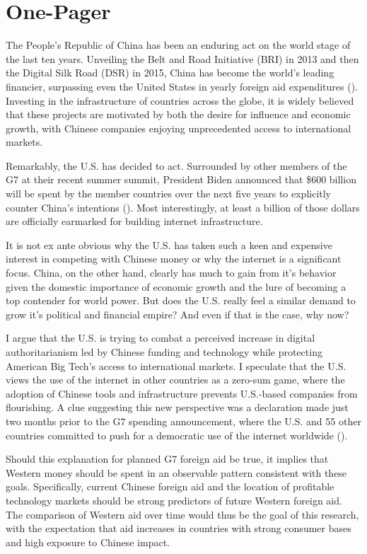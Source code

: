 \documentclass{article}
\begin{document}
\section*{One-Pager}
The People's Republic of China has been an enduring act on the world stage of the last ten years. Unveiling the Belt and Road Initiative (BRI) in 2013 and then the Digital Silk Road (DSR) in 2015, China has become the world's leading financier, surpassing even the United States in yearly foreign aid expenditures (\cite{dreherND}).
Investing in the infrastructure of countries across the globe, it is widely believed that these projects are motivated by both the desire for influence and economic growth, with Chinese companies enjoying unprecedented access to international markets.

Remarkably, the U.S. has decided to act. Surrounded by other members of the G7 at their recent summer summit, President Biden announced that \$600 billion will be spent by the member countries over the next five years to explicitly counter China's intentions (\cite{NPR}). Most interestingly, at least a billion of those dollars are officially earmarked for building internet infrastructure. \nocite{US} \nocite{DSR}

It is not ex ante obvious why the U.S. has taken such a keen and expensive interest in competing with Chinese money or why the internet is a significant focus. China, on the other hand, clearly has much to gain from it's behavior given the domestic importance of economic growth and the lure of becoming a top contender for world power. But does the U.S. really feel a similar demand to grow it's political and financial empire? And even if that is the case, why now?

I argue that the U.S. is trying to combat a perceived increase in digital authoritarianism led by Chinese funding and technology while protecting American Big Tech's access to international markets. I speculate that the U.S. views the use of the internet in other countries as a zero-sum game, where the adoption of Chinese tools and infrastructure prevents U.S.-based companies from flourishing. A clue suggesting this new perspective was a declaration made just two months prior to the G7 spending announcement, where the U.S. and 55 other countries committed to push for a democratic use of the internet worldwide (\cite{Declaration}).

Should this explanation for planned G7 foreign aid be true, it implies that Western money should be spent in an observable pattern consistent with these goals. Specifically, current Chinese foreign aid and the location of profitable technology markets should be strong predictors of future Western foreign aid. The comparison of Western aid over time would thus be the goal of this research, with the expectation that aid increases in countries with strong consumer bases and high exposure to Chinese impact. 
\end{document}
